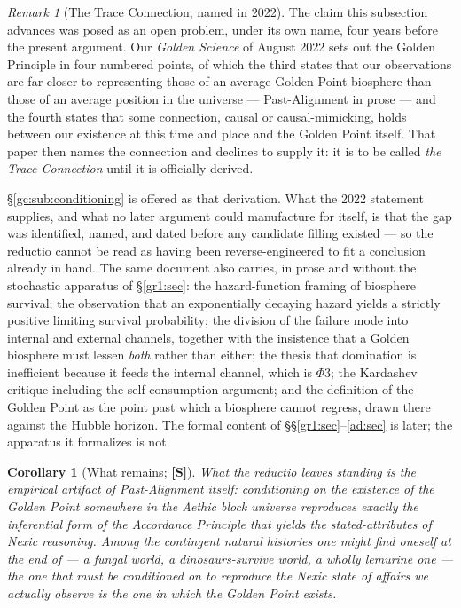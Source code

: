 \documentclass[11pt]{article}
\numberwithin{equation}{section}
\theoremstyle{plain}
\newtheorem{corollary}[theorem]{Corollary}
\theoremstyle{definition}
\theoremstyle{remark}
\newtheorem{remark}[theorem]{Remark}
\begin{document}
\begin{remark}[The Trace Connection, named in 2022]
\label{gc:rem:trace}
The claim this subsection advances was posed as an open problem, under
its own name, four years before the present argument. Our
\emph{Golden Science} of August 2022 \cite{GoldenScience22} sets out the
Golden Principle in four numbered points, of which the third states that
our observations are far closer to representing those of an average
Golden-Point biosphere than those of an average position in the universe
--- Past-Alignment in prose --- and the fourth states that some
connection, causal or causal-mimicking, holds between our existence at
this time and place and the Golden Point itself. That paper then names
the connection and declines to supply it: it is to be called \emph{the
Trace Connection} until it is officially derived.

\S\ref{gc:sub:conditioning} is offered as that derivation. What the 2022
statement supplies, and what no later argument could manufacture for
itself, is that the gap was identified, named, and dated before any
candidate filling existed --- so the reductio cannot be read as having
been reverse-engineered to fit a conclusion already in hand. The same
document also carries, in prose and without the stochastic apparatus of
\S\ref{gr1:sec}: the hazard-function framing of biosphere survival; the
observation that an exponentially decaying hazard yields a strictly
positive limiting survival probability; the division of the failure mode
into internal and external channels, together with the insistence that a
Golden biosphere must lessen \emph{both} rather than either; the thesis
that domination is inefficient because it feeds the internal channel,
which is $\Phi3$; the Kardashev critique including the
self-consumption argument; and the definition of the Golden Point as the
point past which a biosphere cannot regress, drawn there against the
Hubble horizon. The formal content of
\S\S\ref{gr1:sec}--\ref{ad:sec} is later; the apparatus it formalizes is
not.
\end{remark}

\begin{corollary}[What remains; \textbf{[S]}]\label{gc:cor:remains}
What the reductio leaves standing is the empirical artifact of
Past-Alignment itself: conditioning on the existence of the Golden Point
somewhere in the Aethic block universe reproduces exactly the
inferential form of the Accordance Principle that yields the
stated-attributes of Nexic reasoning. Among the contingent natural
histories one might find oneself at the end of --- a fungal world, a
dinosaurs-survive world, a wholly lemurine one --- the one that must be
conditioned on to reproduce the Nexic state of affairs we actually
observe is the one in which the Golden Point exists.
\end{corollary}
\end{document}
